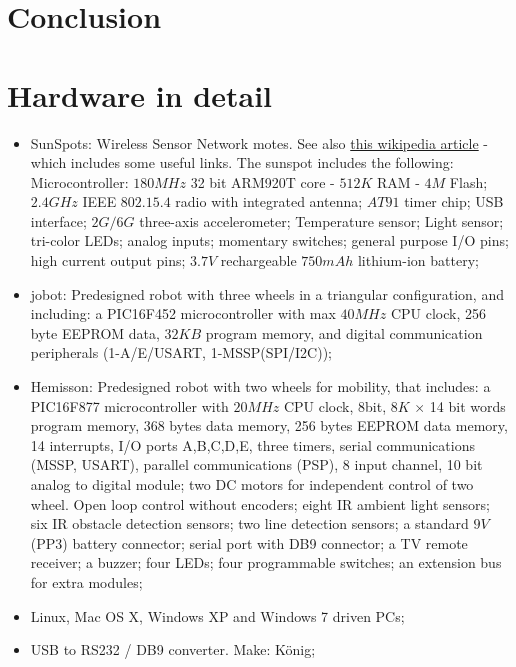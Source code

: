 \documentclass[a4paper, 12pt, titlepage]{article}
\begin{document}
\section{Conclusion}

\newpage
\appendix

\section{Hardware in detail}
\label{hardware}
\begin{itemize}
    \item SunSpots: Wireless Sensor Network motes. See also 
    \href{http://en.wikipedia.org/wiki/Sun_SPOT}
        {this wikipedia article} - which includes some useful links. The sunspot
        includes the following:
        \subitem Microcontroller: $180 MHz$ 32 bit ARM920T core - $512K$ RAM -
        $4M$
        Flash;
        \subitem $2.4 GHz$ IEEE $802.15.4$ radio with integrated antenna;
        \subitem $AT91$ timer chip;
        \subitem USB interface;
        \subitem $2G/6G$ three-axis accelerometer;
        \subitem Temperature sensor;
        \subitem Light sensor;
         tri-color LEDs;
         analog inputs;
         momentary switches;
         general purpose I/O pins;
         high current output pins;
        \subitem $3.7V$ rechargeable $750 mAh$ lithium-ion battery;
    \item jobot: Predesigned robot with three wheels in a triangular
    configuration, and including:
        \subitem a PIC16F452 microcontroller with max $40MHz$ CPU clock, 256 byte
        EEPROM data, $32KB$ program memory, and digital communication peripherals
        (1-A/E/USART, 1-MSSP(SPI/I2C));
    \item Hemisson: Predesigned robot with two wheels for mobility, that includes:
        \subitem a PIC16F877 microcontroller with $20MHz$ CPU clock, 8bit,
        $8K$ $\times$ 14 bit words program memory, 368 bytes data memory, 256 bytes
        EEPROM data memory, 14 interrupts, I/O ports A,B,C,D,E, three timers,
        serial communications (MSSP, USART), parallel communications (PSP), 8
        input channel, 10 bit analog to digital module;
        \subitem two DC motors for independent control of two wheel. Open loop
        control without encoders;
        \subitem eight IR ambient light sensors;
        \subitem six IR obstacle detection sensors;
        \subitem two line detection sensors;
        \subitem a standard $9V$ (PP3) battery connector;
        \subitem serial port with DB9 connector;
        \subitem a TV remote receiver;
        \subitem a buzzer;
        \subitem four LEDs;
        \subitem four programmable switches;
        \subitem an extension bus for extra modules;
    \item Linux, Mac OS X, Windows XP and Windows 7 driven PCs;
    \item USB to RS232 / DB9 converter. Make: K\"onig;
        

\end{itemize}



\end{document}
